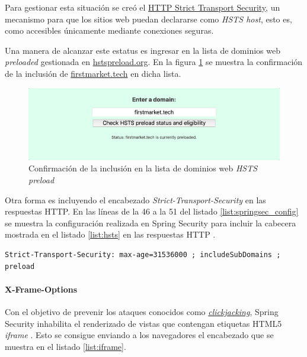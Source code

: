 \documentclass[a4paper,12pt,twoside,openright]{report}
\begin{document}
	Para gestionar esta situación se creó el \href{https://tools.ietf.org/html/rfc6797}{HTTP Strict Transport Security}, un mecanismo para que los sitios web puedan declararse como \emph{HSTS host}, esto es, como accesibles únicamente mediante conexiones seguras.
	
	Una manera de alcanzar este estatus es ingresar en la lista de dominios web \emph{preloaded} gestionada en \href{https://hstspreload.org/}{hstspreload.org}. En la figura \ref{fig:hsts_preload} se muestra la confirmación de la inclusión de \href{https://firstmarket.tech}{firstmarket.tech} en dicha lista.
	
	\begin{figure}[hbt!]
		\centering
		\includegraphics[width=\textwidth,keepaspectratio]{hsts_preload}
		\caption{Confirmación de la inclusión en la lista de dominios web \emph{HSTS preload}}
		\label{fig:hsts_preload}
	\end{figure}
	
	Otra forma es incluyendo el encabezado \emph{Strict-Transport-Security} en las respuestas HTTP. En las líneas de la 46 a la 51 del listado \ref{list:springsec_config} se muestra la configuración realizada en Spring Security para incluir la cabecera mostrada en el listado \ref{list:hsts} en las respuestas HTTP \cite{Alex2020}.
	\\
	
	\begin{lstlisting}[caption=Cabecera de declaración \emph{HSTS host}, label=list:hsts]
	 Strict-Transport-Security: max-age=31536000 ; includeSubDomains ; preload
	\end{lstlisting}
	
	\paragraph{X-Frame-Options}
	Con el objetivo de prevenir los ataques conocidos como \href{https://en.wikipedia.org/wiki/Clickjacking}{\emph{clickjacking}}, Spring Security inhabilita el renderizado de vistas que contengan etiquetas HTML5 \emph{iframe} \cite{Alex2020}. Esto se consigue enviando a los navegadores el encabezado que se muestra en el listado \ref{list:iframe}.
	\\
	
\end{document}
